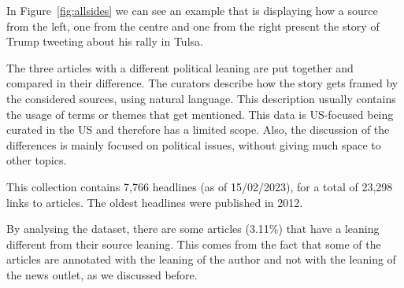 In Figure~\ref{fig:allsides} we can see an example that is displaying how a source from the left, one from the centre and one from the right present the story of Trump tweeting about his rally in Tulsa.



The three articles with a different political leaning are put together and compared in their difference.
The curators describe how the story gets framed by the considered sources, using natural language.
This description usually contains the usage of terms or themes that get mentioned.
This data is US-focused being curated in the US and therefore has a limited scope. Also, the discussion of the differences is mainly focused on political issues, without giving much space to other topics.




This collection contains 7,766 headlines (as of 15/02/2023), for a total of 23,298 links to articles.
The oldest headlines were published in 2012.

By analysing the dataset, there are some articles (3.11\%) %
that have a leaning different from their source leaning.
This comes from the fact that some of the articles are annotated with the leaning of the author and not with the leaning of the news outlet, as we discussed before.


